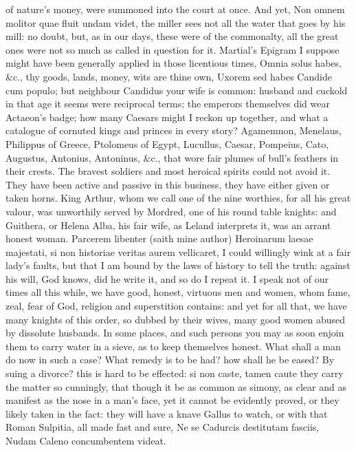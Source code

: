 {of nature's money, were summoned into the court at once. And yet, Non
omnem molitor quae fluit undam videt, the miller sees not all the water
that goes by his mill: no doubt, but, as in our days, these were of the
commonalty, all the great ones were not so much as called in question
for it. Martial's Epigram I suppose might have been generally
applied in those licentious times, Omnia solus habes, \&c., thy goods,
lands, money, wits are thine own, Uxorem sed habes Candide cum populo;
but neighbour Candidus your wife is common: husband and cuckold in that
age it seems were reciprocal terms; the emperors themselves did wear
Actaeon's badge; how many Caesars might I reckon up together, and what
a catalogue of cornuted kings and princes in every story? Agamemnon,
Menelaus, Philippus of Greece, Ptolomeus of Egypt, Lucullus, Caesar,
Pompeius, Cato, Augustus, Antonius, Antoninus, \&c., that wore fair
plumes of bull's feathers in their crests. The bravest soldiers and
most heroical spirits could not avoid it. They have been active and
passive in this business, they have either given or taken horns.
King Arthur, whom we call one of the nine worthies, for all his
great valour, was unworthily served by Mordred, one of his round table
knights: and Guithera, or Helena Alba, his fair wife, as Leland
interprets it, was an arrant honest woman. Parcerem libenter (saith
mine author) Heroinarum laesae majestati, si non historiae
veritas aurem vellicaret, I could willingly wink at a fair lady's
faults, but that I am bound by the laws of history to tell the truth:
against his will, God knows, did he write it, and so do I repeat it. I
speak not of our times all this while, we have good, honest, virtuous
men and women, whom fame, zeal, fear of God, religion and superstition
contains: and yet for all that, we have many knights of this order, so
dubbed by their wives, many good women abused by dissolute husbands. In
some places, and such persons you may as soon enjoin them to carry
water in a sieve, as to keep themselves honest. What shall a man do now
in such a case? What remedy is to be had? how shall he be eased? By
suing a divorce? this is hard to be effected: si non caste, tamen caute
they carry the matter so cunningly, that though it be as common as
simony, as clear and as manifest as the nose in a man's face, yet it
cannot be evidently proved, or they likely taken in the fact: they will
have a knave Gallus to watch, or with that Roman Sulpitia, all
made fast and sure,
Ne se Cadurcis destitutam fasciis,
Nudam Caleno concumbentem videat.

}
